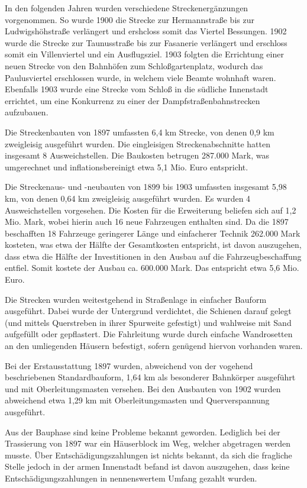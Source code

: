 In den folgenden Jahren wurden verschiedene Streckenergänzungen vorgenommen. So
wurde 1900 die Strecke zur Hermannstraße bis zur Ludwigshöhstraße verlängert und
ershcloss somit das Viertel Bessungen. 1902 wurde die Strecke zur Taunusstraße
bis zur Fasanerie verlängert und erschloss somit ein Villenviertel und ein
Ausflugsziel. 1903 folgten die Errichtung einer neuen Strecke von den Bahnhöfen
zum Schloßgartenplatz, wodurch das Paulusviertel erschlossen wurde, in welchem
viele Beamte wohnhaft waren. Ebenfalls 1903 wurde eine Strecke vom Schloß in die
südliche Innenstadt errichtet, um eine Konkurrenz zu einer der
Dampfstraßenbahnstrecken aufzubauen.

Die Streckenbauten von 1897 umfassten 6,4 km Strecke, von denen 0,9 km
zweigleisig ausgeführt wurden. Die eingleisigen Streckenabschnitte hatten
insgesamt 8 Ausweichstellen.  Die Baukosten betrugen 287.000 Mark, was
umgerechnet und inflationsbereinigt etwa 5,1 Mio. Euro entspricht. \cite{UmrechnungGoldmark}

Die Streckenaus- und -neubauten von 1899 bis 1903 umfassten insgesamt 5,98 km,
von denen 0,64 km zweigleisig ausgeführt wurden. Es wurden 4 Ausweichstellen
vorgesehen. Die Kosten für die Erweiterung beliefen sich auf 1,2 Mio. Mark,
wobei hierin auch 16 neue Fahrzeugen enthalten sind. Da die 1897 beschafften 18
Fahrzeuge geringerer Länge und einfacherer Technik 262.000 Mark kosteten, was
etwa der Hälfte der Gesamtkosten entspricht, ist davon auszugehen, dass etwa die
Hälfte der Investitionen in den Ausbau auf die Fahrzeugbeschaffung
entfiel. Somit kostete der Ausbau ca. 600.000 Mark. Das entspricht etwa 5,6 Mio.
Euro.

Die Strecken wurden weitestgehend in Straßenlage in einfacher Bauform
ausgeführt. Dabei wurde der Untergrund verdichtet, die Schienen darauf gelegt
(und mittels Querstreben in ihrer Spurweite gefestigt) und wahlweise mit Sand
aufgefüllt oder gepflastert. Die Fahrleitung wurde durch einfache Wandrosetten
an den umliegenden Häusern befestigt, sofern genügend hiervon vorhanden waren.

Bei der Erstausstattung 1897 wurden, abweichend von der vogehend beschriebenen
Standardbauform, 1,64 km als besonderer Bahnkörper ausgeführt und mit
Oberleitungsmasten versehen.  Bei den Ausbauten von 1902 wurden abweichend etwa
1,29 km mit Oberleitungsmasten und Querverspannung ausgeführt.

Aus der Bauphase sind keine Probleme bekannt geworden. Lediglich bei der
Trassierung von 1897 war ein Häuserblock im Weg, welcher abgetragen werden
musste. Über Entschädigungszahlungen ist nichts bekannt, da sich die fragliche
Stelle jedoch in der armen Innenstadt befand ist davon auszugehen, dass keine
Entschädigungszahlungen in nennenswertem Umfang gezahlt wurden.

